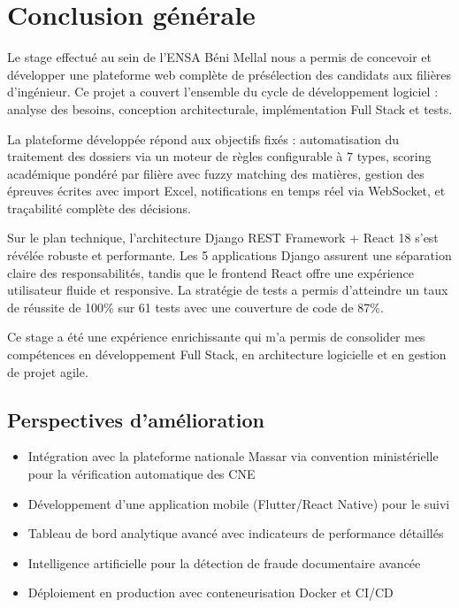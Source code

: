 \chapter*{Conclusion générale}

Le stage effectué au sein de l'ENSA Béni Mellal nous a permis de concevoir et développer une plateforme web complète de présélection des candidats aux filières d'ingénieur. Ce projet a couvert l'ensemble du cycle de développement logiciel : analyse des besoins, conception architecturale, implémentation Full Stack et tests.

La plateforme développée répond aux objectifs fixés : automatisation du traitement des dossiers via un moteur de règles configurable à 7 types, scoring académique pondéré par filière avec fuzzy matching des matières, gestion des épreuves écrites avec import Excel, notifications en temps réel via WebSocket, et traçabilité complète des décisions.

Sur le plan technique, l'architecture Django REST Framework + React 18 s'est révélée robuste et performante. Les 5 applications Django assurent une séparation claire des responsabilités, tandis que le frontend React offre une expérience utilisateur fluide et responsive. La stratégie de tests a permis d'atteindre un taux de réussite de 100\% sur 61 tests avec une couverture de code de 87\%.

Ce stage a été une expérience enrichissante qui m'a permis de consolider mes compétences en développement Full Stack, en architecture logicielle et en gestion de projet agile.

\section{Perspectives d'amélioration}

\begin{itemize}
\item Intégration avec la plateforme nationale Massar via convention ministérielle pour la vérification automatique des CNE
\item Développement d'une application mobile (Flutter/React Native) pour le suivi
\item Tableau de bord analytique avancé avec indicateurs de performance détaillés
\item Intelligence artificielle pour la détection de fraude documentaire avancée
\item Déploiement en production avec conteneurisation Docker et CI/CD
\end{itemize}


